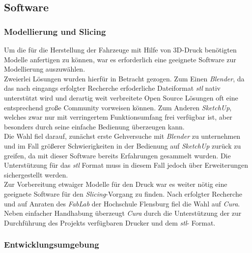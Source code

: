 \documentclass[.../Dokumentation.tex]{subfiles}
\begin{document}
    \subsection{Software}\label{sec-components-software}
    \subsubsection{Modellierung und Slicing}\label{sec-components-software-model}
    Um die für die Herstellung der Fahrzeuge mit Hilfe von 3D-Druck benötigten 
    Modelle anfertigen zu können, war es erforderlich eine geeignete Software 
    zur Modellierung auszuwählen.\\
    Zweierlei Lösungen wurden hierfür in Betracht gezogen.
    Zum Einen \textit{Blender}, %
    da das nach eingangs erfolgter Recherche erfoderliche Dateiformat 
    \textit{stl} nativ unterstützt wird und derartig weit verbreitete Open 
    Source Lösungen oft eine entsprechend große Community vorweisen können.
    Zum Anderen \textit{SketchUp}, %
    welches zwar nur mit verringertem 
    Funktionsumfang frei verfügbar ist, aber besonders durch seine einfache 
    Bedienung überzeugen kann.\\
    Die Wahl fiel darauf, zunächst erste Gehversuche mit \textit{Blender} 
    zu unternehmen und im Fall größerer Schwierigkeiten in der Bedienung auf 
    \textit{SketchUp} zurück zu greifen, da mit dieser Software bereits 
    Erfahrungen gesammelt wurden. Die Unterstützung für das \textit{stl} Format 
    muss in diesem Fall jedoch über Erweiterungen sichergestellt werden.\\
    Zur Vorbereitung etwaiger Modelle für den Druck war es weiter nötig 
    eine geeignete Software für den \textit{Slicing}-Vorgang zu finden.
    Nach erfolgter Recherche und auf Anraten des \textit{FabLab} der Hochschule 
    Flensburg fiel die Wahl auf \textit{Cura}.%
    Neben einfacher Handhabung überzeugt \textit{Cura} durch die Unterstützung 
    der zur Durchführung des Projekts verfügbaren Drucker und dem \textit{stl}-
    Format.
    \subsubsection{Entwicklungsumgebung}
\end{document}
